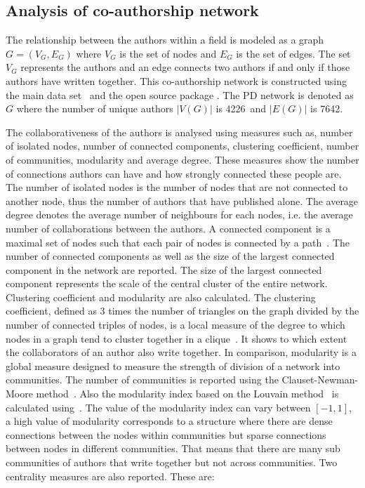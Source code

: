 \documentclass{article}
\theoremstyle{definition}
\newcommand{\authors}{4226}
\newcommand{\edges}{7642}
\begin{document}
\subsection{Analysis of co-authorship network}\label{subsection:co_authorship}

The relationship between the authors within a field is modeled as a graph
\(G = (V_G, E_G)\) where \(V_G\) is the set of nodes and \(E_G\)  is the set of
edges. The set \(V_G\) represents the authors and an edge connects two authors
if and only if those authors have written together. This co-authorship network is
constructed using the main data set~\cite{pd_data_2018} and the open source package
\cite{networkx}. The PD network is denoted as \(G\) where the
number of unique authors \(|V(G)|\) is \authors~and \(|E(G)|\) is \edges.


The collaborativeness of the authors is analysed using measures such as, number of isolated nodes,
number of connected components, clustering coefficient, number of communities, modularity and average degree.
These measures show the number of connections authors can have
and how strongly connected these people are. The number of isolated nodes is the
number of nodes that are not connected to another node, thus the
number of authors that have published alone. The average degree denotes the average
number of neighbours for each nodes, i.e. the average number of collaborations
between the authors.
A connected component is a maximal set of nodes such that each pair of nodes is
connected by a path~\cite{Easley2010}. The number of connected components as well as the size of the
largest connected component in the network are reported.
The size of the largest connected component represents the scale of the central cluster
of the entire network.
Clustering coefficient and modularity are also calculated. The clustering
coefficient, defined as 3 times the number of triangles on the graph divided
by the number of connected triples of nodes, is a local measure of the degree to
which nodes in a graph tend to cluster together
in a clique~\cite{Easley2010}. It shows to which extent the collaborators
of an author also write together.
In comparison, modularity is a global measure designed to measure the strength of
division of a network into communities. The number of communities is reported
using the Clauset-Newman-Moore method~\cite{clauset2004}. Also the modularity index
based on the Louvain method~\cite{Blondel2008} is calculated using~\cite{python_louvain}. The value
of the modularity index can vary between \([-1, 1]\), a high value of modularity
corresponds to a structure where there are dense connections between the nodes within
communities but sparse connections between nodes in different communities.
That means that there are many sub communities of authors that write together
but not across communities.
Two centrality measures are also reported. These are:
\end{document}
